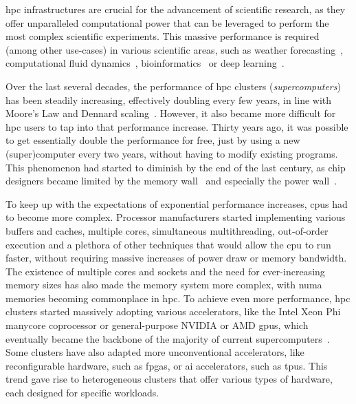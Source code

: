 \gls{hpc} infrastructures are crucial for the advancement of scientific
research, as they offer unparalleled computational power that can be leveraged to perform the most
complex scientific experiments. This massive performance is required (among other use-cases) in
various scientific areas, such as weather forecasting~\cite{wrf}, computational fluid
dynamics~\cite{cfd}, bioinformatics~\cite{bioinformatics} or deep
learning~\cite{hpcdl}.

Over the last several decades, the performance of \gls{hpc} clusters
(\emph{supercomputers}) has been steadily increasing, effectively doubling every few years, in
line with Moore's Law and Dennard scaling~\cite{mooreslaw}. However, it also became more
difficult for \gls{hpc} users to tap into that performance increase. Thirty years ago,
it was possible to get essentially double the performance for free, just by using a new
(super)computer every two years, without having to modify existing programs. This phenomenon had
started to diminish by the end of the last century, as chip designers became limited by the memory
wall~\cite{memorywall} and especially the power wall~\cite{powerwall}.

To keep up with the expectations of exponential performance increases, \glspl{cpu} had
to become more complex. Processor manufacturers started implementing various buffers and caches,
multiple cores, simultaneous multithreading, out-of-order execution and a plethora of other
techniques that would allow the \gls{cpu} to run faster, without requiring massive
increases of power draw or memory bandwidth. The existence of multiple cores and sockets and the
need for ever-increasing memory sizes has also made the memory system more complex, with
\gls{numa} memories becoming commonplace in \gls{hpc}. To achieve even
more performance, \gls{hpc} clusters started massively adopting various accelerators,
like the Intel Xeon Phi~\cite{xeonphi} manycore coprocessor or general-purpose NVIDIA or
AMD \glspl{gpu}, which eventually became the backbone of the majority of current
supercomputers~\cite{top500gpu}. Some clusters have also adapted more unconventional
accelerators, like reconfigurable hardware, such as \glspl{fpga}, or
\gls{ai} accelerators, such as \glspl{tpu}. This trend gave rise to
heterogeneous clusters that offer various types of hardware, each designed for specific workloads.

